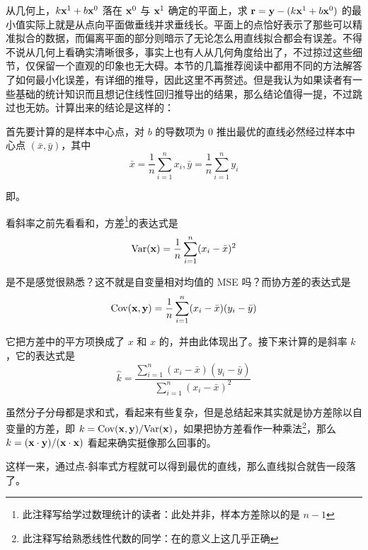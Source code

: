 从几何上，$k{\mathbf{x}}^1 + b{\mathbf{x}}^0$ 落在 ${\mathbf{x}}^0$ 与 ${\mathbf{x}}^1$ 确定的平面上，求 ${\mathbf{r}} = {\mathbf{y}} - (k{\mathbf{x}}^1 + b{\mathbf{x}}^0)$ 的最小值实际上就是从点向平面做垂线并求垂线长。平面上的点恰好表示了那些可以精准拟合的数据，而偏离平面的部分则暗示了无论怎么用直线拟合都会有误差。不得不说从几何上看确实清晰很多，事实上也有人从几何角度给出了，不过掠过这些细节，仅保留一个直观的印象也无大碍。本节的几篇推荐阅读中都用不同的方法解答了如何最小化误差，有详细的推导，因此这里不再赘述。但是我认为如果读者有一些基础的统计知识而且想记住线性回归推导出的结果，那么结论值得一提，不过跳过也无妨。计算出来的结论是这样的：

首先要计算的是样本中心点，对 $b$ 的导数项为 0 推出最优的直线必然经过样本中心点 $(\bar x, \bar y)$，其中
\[
    \bar x = \frac1n \sum_{i=1}^n x_i, \bar y = \frac1n \sum_{i=1}^n y_i
\]

即。

看斜率之前先看看和，方差\footnote{此注释写给学过数理统计的读者：此处并非，样本方差除以的是 $n-1$}的表达式是
\[
    \text{Var}({\mathbf{x}}) = \frac1n \sum_{i=1}^n (x_i - \bar x)^2
\]

是不是感觉很熟悉？这不就是自变量相对均值的 MSE 吗？而协方差的表达式是
\[
    \text{Cov}({\mathbf{x}}, {\mathbf{y}}) = \frac1n \sum_{i=1}^n (x_i - \bar x)(y_i - \bar y)
\]

它把方差中的平方项换成了 $x$ 和 $x$ 的，并由此体现出了。接下来计算的是斜率 $k$，它的表达式是
\[
    \hat k = \frac{\sum_{i=1}^n (x_i - \bar x)(y_i - \bar y)}{\sum_{i=1}^n (x_i - \bar x)^2}
\]

虽然分子分母都是求和式，看起来有些复杂，但是总结起来其实就是协方差除以自变量的方差，即 $k = \text{Cov}({\mathbf{x}}, {\mathbf{y}}) / \text{Var}({\mathbf{x}})$，如果把协方差看作一种乘法\footnote{此注释写给熟悉线性代数的同学：在的意义上这几乎正确}，那么 $k = ({\mathbf{x}}\cdot {\mathbf{y}}) / ({\mathbf{x}}\cdot {\mathbf{x}})$ 看起来确实挺像那么回事的。

这样一来，通过点-斜率式方程就可以得到最优的直线，那么直线拟合就告一段落了。

